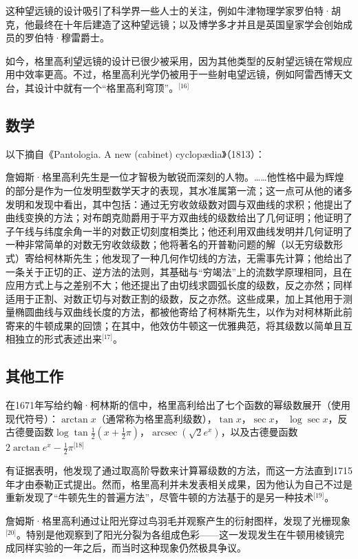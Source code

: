 这种望远镜的设计吸引了科学界一些人士的关注，例如牛津物理学家罗伯特·胡克，他最终在十年后建造了这种望远镜；以及博学多才并且是英国皇家学会创始成员的罗伯特·穆雷爵士。

如今，格里高利望远镜的设计已很少被采用，因为其他类型的反射望远镜在常规应用中效率更高。不过，格里高利光学仍被用于一些射电望远镜，例如阿雷西博天文台，其设计中就有一个“格里高利穹顶”。\(^\text{[16]}\)
\subsection{数学}
以下摘自《Pantologia. A new (cabinet) cyclopædia》（1813）：

詹姆斯·格里高利先生是一位才智极为敏锐而深刻的人物。……他性格中最为辉煌的部分是作为一位发明型数学天才的表现，其水准属第一流；这一点可从他的诸多发明和发现中看出，其中包括：通过无穷收敛级数对圆与双曲线的求积；他提出了曲线变换的方法；对布朗克勋爵用于平方双曲线的级数给出了几何证明；他证明了子午线与纬度余角一半的对数正切刻度相类比；他还利用双曲线发明并几何证明了一种非常简单的对数无穷收敛级数；他将著名的开普勒问题的解（以无穷级数形式）寄给柯林斯先生；他发现了一种几何作切线的方法，无需事先计算；他给出了一条关于正切的正、逆方法的法则，其基础与“穷竭法”上的流数学原理相同，且在应用方式上与之差别不大；他还提出了由切线求圆弧长度的级数，反之亦然；同样适用于正割、对数正切与对数正割的级数，反之亦然。这些成果，加上其他用于测量椭圆曲线与双曲线长度的方法，都被他寄给了柯林斯先生，以作为对柯林斯此前寄来的牛顿成果的回馈；在其中，他效仿牛顿这一优雅典范，将其级数以简单且互相独立的形式表述出来\(^\text{[17]}\)。
\subsection{其他工作}
在1671年写给约翰·柯林斯的信中，格里高利给出了七个函数的幂级数展开（使用现代符号）：$\arctan x $（通常称为格里高利级数），$\tan x$，$\sec x$， 
$\log \sec x$，反古德曼函数$\log \tan \tfrac{1}{2}\left(x+\tfrac{1}{2}\pi\right)$，$\operatorname{arcsec}\!\left(\sqrt{2}e^x\right)$，以及古德曼函数$2\arctan e^x - \tfrac{1}{2}\pi$\(^\text{[18]}\)  

有证据表明，他发现了通过取高阶导数来计算幂级数的方法，而这一方法直到1715年才由泰勒正式提出。然而，格里高利并未发表相关成果，因为他认为自己不过是重新发现了“牛顿先生的普遍方法”，尽管牛顿的方法基于的是另一种技术\(^\text{[19]}\)。  

詹姆斯·格里高利通过让阳光穿过鸟羽毛并观察产生的衍射图样，发现了光栅现象\(^\text{[20]}\)。特别是他观察到了阳光分裂为各组成色彩——这一发现发生在牛顿用棱镜完成同样实验的一年之后，而当时这种现象仍然极具争议。  


